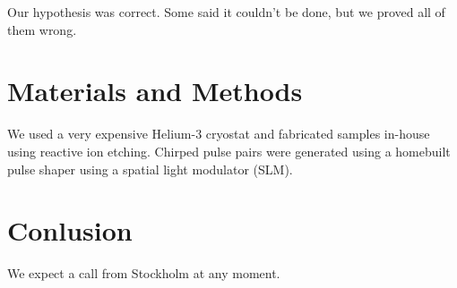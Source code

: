 \documentclass[11pt]{amsart}
\begin{document}
Our hypothesis was correct. Some said it couldn't be done, but we
proved all of them wrong.

\section{Materials and Methods}

We used a very expensive Helium-3 cryostat and fabricated samples
in-house using reactive ion etching. Chirped pulse pairs were
generated using a homebuilt pulse shaper using a spatial light
modulator (SLM).

\section{Conlusion}

We expect a call from Stockholm at any moment.
\end{document}
